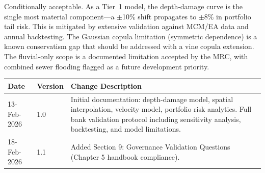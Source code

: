\documentclass[11pt,a4paper]{article}
\begin{document}
Conditionally acceptable. As a Tier~1 model, the depth-damage curve is the single most material component---a $\pm$10\% shift propagates to $\pm$8\% in portfolio tail risk. This is mitigated by extensive validation against MCM/EA data and annual backtesting. The Gaussian copula limitation (symmetric dependence) is a known conservatism gap that should be addressed with a vine copula extension. The fluvial-only scope is a documented limitation accepted by the MRC, with combined sewer flooding flagged as a future development priority.

\clearpage

\mkmchangelog

\begin{longtable}{l|l|p{10cm}}
    \toprule
    \textbf{Date} & \textbf{Version} & \textbf{Change Description} \\
    \midrule
    \endhead
    13-Feb-2026 & 1.0 & Initial documentation: depth-damage model, spatial interpolation,
    velocity model, portfolio risk analytics. Full bank validation protocol including
    sensitivity analysis, backtesting, and model limitations. \\
    \midrule
    18-Feb-2026 & 1.1 & Added Section 9: Governance Validation Questions (Chapter 5
    handbook compliance). \\
    \bottomrule
\end{longtable}

\end{document}
